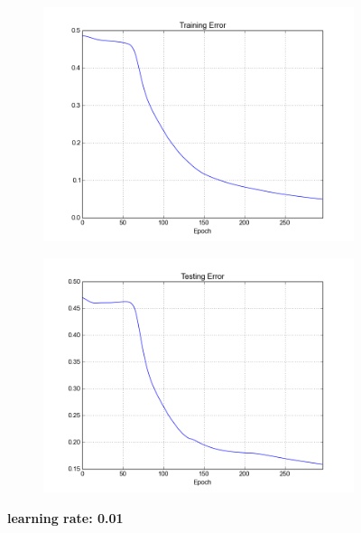 \begin{figure}[h]	
	\begin{subfigure}[b]{0.5\textwidth}
		\includegraphics[width=\linewidth]{fig/trainingerror_lr0,01_eps0,05_regparam0,00_beta5_batch1.png}
	\end{subfigure}
	\begin{subfigure}[b]{0.5\textwidth}
		\includegraphics[width=\linewidth]{fig/valerror_lr0,01_eps0,05_regparam0,00_beta5_batch1.png}
	\end{subfigure}

	\caption{\textbf{learning rate: 0.01}}
\end{figure}



